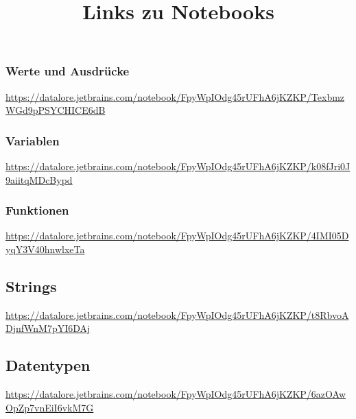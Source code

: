 \documentclass[]{scrartcl}
\title{Links zu Notebooks}
\begin{document}
	
\subsubsection*{Werte und Ausdrücke}

\url{https://datalore.jetbrains.com/notebook/FpyWpIOdg45rUFhA6jKZKP/TexbmzWGd9pPSYCHICE6dB}
	
\subsubsection*{Variablen}

\url{https://datalore.jetbrains.com/notebook/FpyWpIOdg45rUFhA6jKZKP/k08fJri0J9aiitqMDcBypd}
\subsubsection*{Funktionen}

\url{https://datalore.jetbrains.com/notebook/FpyWpIOdg45rUFhA6jKZKP/4IMI05DyqY3V40hnwlxeTa}
\subsection*{Strings}
\url{https://datalore.jetbrains.com/notebook/FpyWpIOdg45rUFhA6jKZKP/t8RbvoADjnfWnM7pYI6DAj}
%
\subsection*{Datentypen}
\url{https://datalore.jetbrains.com/notebook/FpyWpIOdg45rUFhA6jKZKP/6azOAwOpZp7vnEiI6vkM7G}
%
\end{document}

